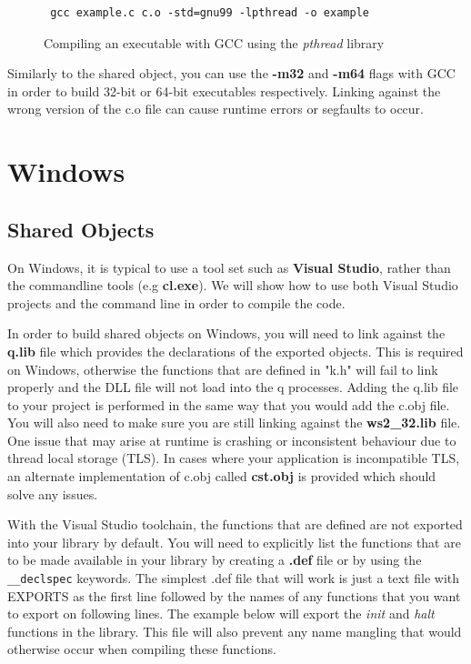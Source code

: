  \begin{figure}[h]
 \begin{lstlisting}
 gcc example.c c.o -std=gnu99 -lpthread -o example
 \end{lstlisting}
 \caption{Compiling an executable with GCC using the \textit{pthread} library}
 \end{figure}
 
 Similarly to the shared object, you can use the \textbf{-m32} and \textbf{-m64} flags with GCC in order to
 build 32-bit or 64-bit executables respectively. Linking against the wrong version of the c.o file can cause
 runtime errors or segfaults to occur. 
 
 \section{Windows}
 
 \subsection{Shared Objects}
 
 On Windows, it is typical to use a tool set such as \textbf{Visual Studio}, rather than the commandline tools (e.g \textbf{cl.exe}). We will show how to use both Visual Studio projects and the command line in order to compile the
 code.
 
 In order to build shared objects on Windows, you will need to link against the \textbf{q.lib} file which provides the declarations of the exported objects. This is required on Windows, otherwise the functions that are defined in "k.h" will fail to link properly and the DLL file will not load into the q processes. Adding the q.lib file to your project is performed in the same way that you would add the c.obj file. You will also need to make sure you are still linking against the \textbf{ws2\_32.lib} file. One issue that may arise at runtime is crashing or inconsistent behaviour due to thread local storage (TLS). In cases where your application is incompatible TLS, an alternate implementation of c.obj called \textbf{cst.obj} is provided which should solve any issues.
 
 With the Visual Studio toolchain, the functions that are defined are not exported into your library
 by default. You will need to explicitly list the functions that are to be made available in your
 library by creating a \textbf{.def} file or by using the \verb|__declspec| keywords. The simplest .def file that
 will work is just a text file with EXPORTS as the first line followed by the names of any functions
 that you want to export on following lines. The example below will export the \textit{init} and \textit{halt} functions in the library. This file will also prevent any name mangling that would otherwise occur when compiling
 these functions.
 
